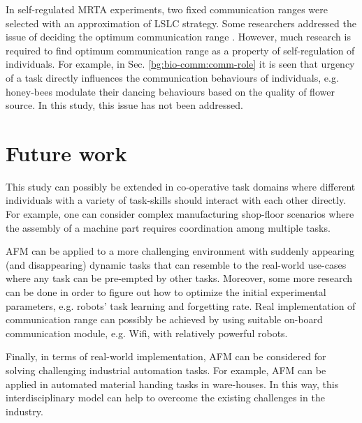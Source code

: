 In self-regulated MRTA experiments, two fixed communication ranges  were selected with an approximation of LSLC strategy. Some researchers addressed the issue of deciding the optimum communication range \cite{Yoshida+2000}. However, much research is required to find optimum communication range as a property of self-regulation of individuals. For example, in Sec. \ref{bg:bio-comm:comm-role}  it is seen that urgency of a task directly influences the communication behaviours of individuals, e.g. honey-bees modulate their dancing behaviours based on the quality of flower source. In this study, this issue has not been addressed.

\section{Future work}
This study can possibly be extended in co-operative task domains where different individuals with a variety of task-skills should interact with each other directly. For example,  one can consider complex manufacturing shop-floor scenarios where the assembly of a machine part requires coordination among multiple tasks. 

AFM can be applied to a more challenging environment with suddenly appearing (and disappearing) dynamic tasks that can resemble to the real-world use-cases where any task can be pre-empted by other tasks. Moreover, some more research can be done in order to figure out how to optimize the initial experimental parameters, e.g. robots' task learning and forgetting rate. Real implementation of communication range can possibly be achieved by using suitable on-board communication module, e.g. Wifi, with  relatively powerful robots.

Finally, in terms of real-world implementation, AFM can be considered for solving challenging industrial automation tasks. For example, AFM can be applied in automated material handing tasks in ware-houses. In this way, this interdisciplinary model can help to overcome the existing challenges in the industry.